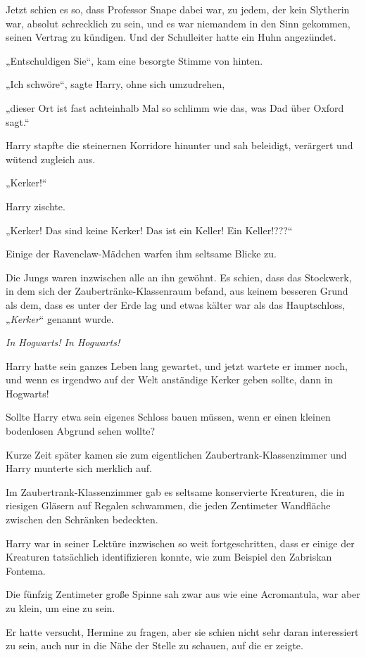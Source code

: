 {Jetzt schien es so, dass Professor Snape dabei war, zu jedem, der kein Slytherin war, absolut schrecklich zu sein, und es war niemandem in den Sinn gekommen, seinen Vertrag zu kündigen. Und der Schulleiter hatte ein Huhn angezündet.

„Entschuldigen Sie“, kam eine besorgte Stimme von hinten.

„Ich schwöre“, sagte Harry, ohne sich umzudrehen,

„dieser Ort ist fast achteinhalb Mal so schlimm wie das, was Dad über Oxford sagt.“

Harry stapfte die steinernen Korridore hinunter und sah beleidigt, verärgert und wütend zugleich aus.

„Kerker!“

Harry zischte.

„Kerker! Das sind keine Kerker! Das ist ein Keller! Ein Keller!???“

Einige der Ravenclaw-Mädchen warfen ihm seltsame Blicke zu.

Die Jungs waren inzwischen alle an ihn gewöhnt. Es schien, dass das Stockwerk, in dem sich der Zaubertränke-Klassenraum befand, aus keinem besseren Grund als dem, dass es unter der Erde lag und etwas kälter war als das Hauptschloss, „\emph{Kerker}“ genannt wurde.

\emph{In Hogwarts! In Hogwarts!}

Harry hatte sein ganzes Leben lang gewartet, und jetzt wartete er immer noch, und wenn es irgendwo auf der Welt anständige Kerker geben sollte, dann in Hogwarts!

Sollte Harry etwa sein eigenes Schloss bauen müssen, wenn er einen kleinen bodenlosen Abgrund sehen wollte?

Kurze Zeit später kamen sie zum eigentlichen Zaubertrank-Klassenzimmer und Harry munterte sich merklich auf.

Im Zaubertrank-Klassenzimmer gab es seltsame konservierte Kreaturen, die in riesigen Gläsern auf Regalen schwammen, die jeden Zentimeter Wandfläche zwischen den Schränken bedeckten.

Harry war in seiner Lektüre inzwischen so weit fortgeschritten, dass er einige der Kreaturen tatsächlich identifizieren konnte, wie zum Beispiel den Zabriskan Fontema.

Die fünfzig Zentimeter große Spinne sah zwar aus wie eine Acromantula, war aber zu klein, um eine zu sein.

Er hatte versucht, Hermine zu fragen, aber sie schien nicht sehr daran interessiert zu sein, auch nur in die Nähe der Stelle zu schauen, auf die er zeigte.

}
